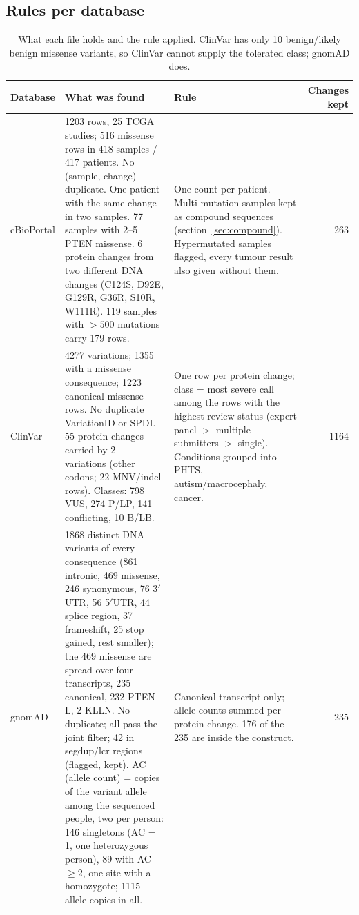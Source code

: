 \documentclass[11pt,a4paper]{article}
\begin{document}
\subsection{Rules per database}

\begin{table}[H]
\centering\small
\begin{tabular}{@{}R{2.2cm}R{4.6cm}R{4.6cm}r@{}}
\toprule
Database & What was found & Rule & Changes kept \\
\midrule
cBioPortal & 1203 rows, 25 TCGA studies; 516 missense rows in 418 samples / 417
patients. No (sample, change) duplicate. One patient with the same change in
two samples. 77 samples with 2--5 PTEN missense. 6 protein changes from two
different DNA changes (C124S, D92E, G129R, G36R, S10R, W111R). 119 samples
with $>500$ mutations carry 179 rows. &
One count per patient. Multi-mutation samples kept as compound sequences
(section~\ref{sec:compound}). Hypermutated samples flagged, every tumour
result also given without them. & 263 \\[2pt]
ClinVar & 4277 variations; 1355 with a missense consequence; 1223 canonical
missense rows. No duplicate VariationID or SPDI. 55 protein changes carried by
2+ variations (other codons; 22 MNV/indel rows). Classes: 798 VUS, 274 P/LP,
141 conflicting, 10 B/LB. &
One row per protein change; class = most severe call among the rows with the
highest review status (expert panel $>$ multiple submitters $>$ single).
Conditions grouped into PHTS, autism/macrocephaly, cancer. & 1164 \\[2pt]
gnomAD & 1868 distinct DNA variants of every consequence (861 intronic, 469
missense, 246 synonymous, 76 3$'$UTR, 56 5$'$UTR, 44 splice region, 37
frameshift, 25 stop gained, rest smaller); the 469 missense are spread over
four transcripts, 235 canonical, 232 PTEN-L, 2 KLLN. No
duplicate; all pass the joint filter; 42 in segdup/lcr regions (flagged,
kept). AC (allele count) = copies of the variant allele among the
sequenced people, two per person: 146 singletons (AC = 1, one heterozygous
person), 89 with AC $\ge 2$, one site with a homozygote; 1115 allele copies
in all. &
Canonical transcript only; allele counts summed per protein change. 176 of
the 235 are inside the construct. & 235 \\
\bottomrule
\end{tabular}
\caption{What each file holds and the rule applied. ClinVar has only 10
benign/likely benign missense variants, so ClinVar cannot supply the tolerated
class; gnomAD does.}
\end{table}
\end{document}
